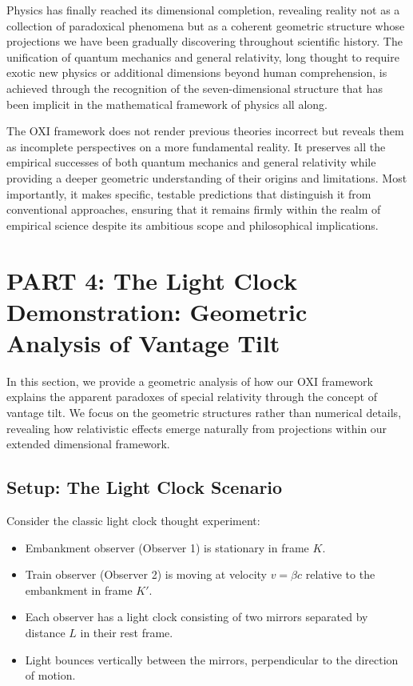 \documentclass{article}
\begin{document}
Physics has finally reached its dimensional completion, revealing reality not as a collection of paradoxical phenomena but as a coherent geometric structure whose projections we have been gradually discovering throughout scientific history. The unification of quantum mechanics and general relativity, long thought to require exotic new physics or additional dimensions beyond human comprehension, is achieved through the recognition of the seven-dimensional structure that has been implicit in the mathematical framework of physics all along.

The OXI framework does not render previous theories incorrect but reveals them as incomplete perspectives on a more fundamental reality. It preserves all the empirical successes of both quantum mechanics and general relativity while providing a deeper geometric understanding of their origins and limitations. Most importantly, it makes specific, testable predictions that distinguish it from conventional approaches, ensuring that it remains firmly within the realm of empirical science despite its ambitious scope and philosophical implications.










\section{PART 4: The Light Clock Demonstration: Geometric Analysis of Vantage Tilt}
In this section, we provide a geometric analysis of how our OXI framework explains the apparent paradoxes of special relativity through the concept of vantage tilt. We focus on the geometric structures rather than numerical details, revealing how relativistic effects emerge naturally from projections within our extended dimensional framework.

\subsection{Setup: The Light Clock Scenario}

Consider the classic light clock thought experiment:

\begin{itemize}
\item Embankment observer (Observer 1) is stationary in frame $K$.
\item Train observer (Observer 2) is moving at velocity $v = \beta c$ relative to the embankment in frame $K'$.
\item Each observer has a light clock consisting of two mirrors separated by distance $L$ in their rest frame.
\item Light bounces vertically between the mirrors, perpendicular to the direction of motion.
\end{itemize}
\end{document}
